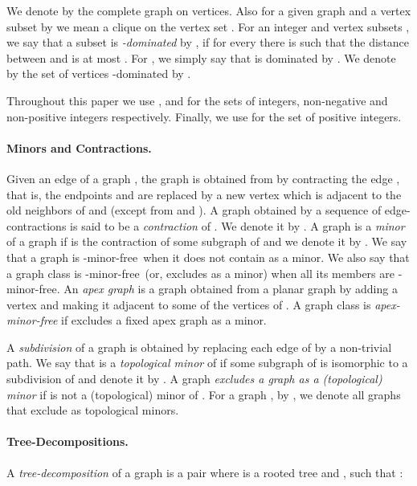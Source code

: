 \documentclass[11pt]{article}
\newcommand{\Hmf}{-minor-free}
\begin{document}
We denote by  the complete graph on  vertices. Also for a given graph  and a vertex subset  by  we mean a clique on 
the vertex set . 
For an integer  and  vertex subsets , we say that a subset  is \emph{-dominated} by , if for every   there is  such that the distance between  and  is at most . For , we simply say that  is dominated by .  We denote by   the set of vertices -dominated by .  

Throughout this paper we use ,    and    for the sets of  integers,  non-negative and 
non-positive integers respectively.   Finally,  we use  for the set of positive integers.
\paragraph{Minors and Contractions.}
Given an edge   of a graph , the graph   is
obtained from   by contracting the edge , that is,
the endpoints   and  are replaced by a new vertex 
which  is  adjacent to the old neighbors of  and  (except
from  and ).  A graph  obtained by a sequence of
edge-contractions is said to be a \emph{contraction} of .  We denote it by .
A graph  is a {\em minor} of a graph  if  is the contraction of some subgraph
of  and we denote it by .
We say that a graph  is {\Hmf \,} when it does not
contain  as a minor. We also say that a graph class 
is {\Hmf \,} (or, excludes  as a minor)  when
all its members are \Hmf.
An \emph{apex graph} is a graph obtained from a planar graph 
by adding a vertex and making it adjacent to some of the vertices of .
A graph class  is \emph{apex-minor-free} if 
excludes a fixed apex graph  as a minor.





A \emph{subdivision} of a graph  is obtained by replacing each edge of  by a non-trivial path. We say that  is a \emph{topological minor} of  if some subgraph of  is isomorphic to a subdivision of  and denote it by . 
A graph  \emph{excludes a graph  as a (topological) minor} if  is not a (topological) minor of .  For a graph , 
by , we denote all graphs that exclude  as  topological minors.



















\paragraph{ Tree-Decompositions.} A \emph{tree-decomposition} of a graph  is a pair  where  
is a rooted tree and , such that :
\end{document}
